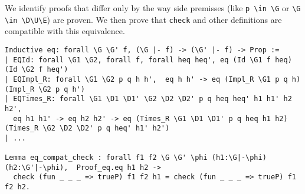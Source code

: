\documentclass[runningheads,a4paper]{llncs}
\begin{document}
We identify proofs that differ only by the way side premisses (like
\lstinline!p \in \G! or \lstinline!\G \in \D\U\E!) are proven. We then
prove that \texttt{check} and other definitions are compatible with
this equivalence.
\begin{lstlisting}
Inductive eq: forall \G \G' f, (\G |- f) -> (\G' |- f) -> Prop := 
| EQId: forall \G1 \G2, forall f, forall heq heq', eq (Id \G1 f heq) (Id \G2 f heq')
| EQImpl_R: forall \G1 \G2 p q h h',  eq h h' -> eq (Impl_R \G1 p q h) (Impl_R \G2 p q h')
| EQTimes_R: forall \G1 \D1 \D1' \G2 \D2 \D2' p q heq heq' h1 h1' h2 h2',
  eq h1 h1' -> eq h2 h2' -> eq (Times_R \G1 \D1 \D1' p q heq h1 h2)
(Times_R \G2 \D2 \D2' p q heq' h1' h2')
| ...

Lemma eq_compat_check : forall f1 f2 \G \G' \phi (h1:\G|-\phi) (h2:\G'|-\phi),  Proof_eq.eq h1 h2 -> 
  check (fun _ _ _ => trueP) f1 f2 h1 = check (fun _ _ _ => trueP) f1 f2 h2.
\end{lstlisting}








\end{document}
